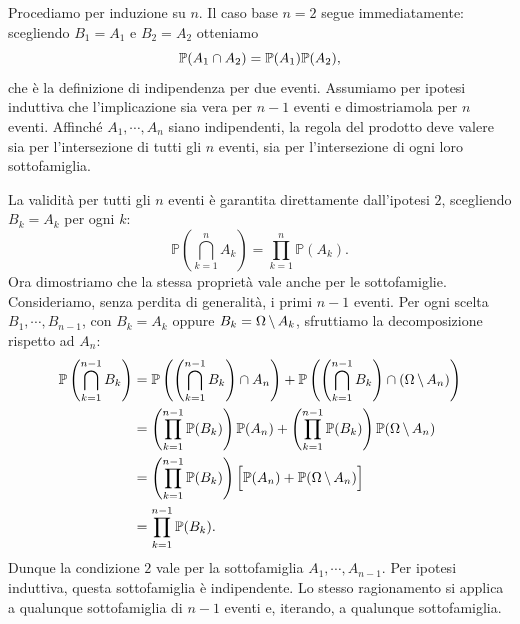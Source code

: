 \documentclass[a4paper]{article}
\begin{document}
\begin{snippetproof}{}
    \begin{ffiproof}
    \item Procediamo per induzione su \(n\).
        Il caso base \(n=2\) segue immediatamente: scegliendo \(B_1=A_1\) e \(B_2=A_2\) otteniamo
        \[
            \mathbb P(A_1 \cap A_2)
            =
            \mathbb P(A_1)\mathbb P(A_2),
        \]
        che è la definizione di indipendenza per due eventi.
        Assumiamo per ipotesi induttiva che l'implicazione sia vera per \(n-1\) eventi e dimostriamola per \(n\) eventi.
        Affinché \(A_1,\cdots,A_n\) siano indipendenti, la regola del prodotto deve valere sia per l'intersezione di tutti gli \(n\) eventi, sia per l'intersezione di ogni loro sottofamiglia.

        La validità per tutti gli \(n\) eventi è garantita direttamente dall'ipotesi \(2\), scegliendo \(B_k=A_k\) per ogni \(k\):
        \[
            \mathbb P\left(\bigcap_{k=1}^n A_k\right)
            =
            \prod_{k=1}^n \mathbb P(A_k).
        \]
        Ora dimostriamo che la stessa proprietà vale anche per le sottofamiglie.
        Consideriamo, senza perdita di generalità, i primi \(n-1\) eventi.
        Per ogni scelta \(B_1,\cdots,B_{n-1}\), con \(B_k=A_k\) oppure \(B_k=\Omega\,\backslash\, A_k\), sfruttiamo la decomposizione rispetto ad \(A_n\):
        \begin{align*}
            \mathbb P\left( \bigcap_{k=1}^{n-1} B_k \right)
            &=
            \mathbb P\left(
                \left( \bigcap_{k=1}^{n-1} B_k \right) \cap A_n
            \right)
            +
            \mathbb P\left(
                \left( \bigcap_{k=1}^{n-1} B_k \right) \cap (\Omega \,\backslash\, A_n)
            \right) \\
            &=
            \left( \prod_{k=1}^{n-1} \mathbb P(B_k) \right)\mathbb P(A_n)
            +
            \left( \prod_{k=1}^{n-1} \mathbb P(B_k) \right)\mathbb P(\Omega \,\backslash\, A_n) \\
            &=
            \left( \prod_{k=1}^{n-1} \mathbb P(B_k) \right)
            \Big[\mathbb P(A_n)+\mathbb P(\Omega\,\backslash\, A_n)\Big] \\
            &=
            \prod_{k=1}^{n-1}\mathbb P(B_k).
        \end{align*}
        Dunque la condizione \(2\) vale per la sottofamiglia \(A_1,\cdots,A_{n-1}\).
        Per ipotesi induttiva, questa sottofamiglia è indipendente.
        Lo stesso ragionamento si applica a qualunque sottofamiglia di \(n-1\) eventi e, iterando, a qualunque sottofamiglia.

\end{ffiproof}
\end{snippetproof}
\end{document}
